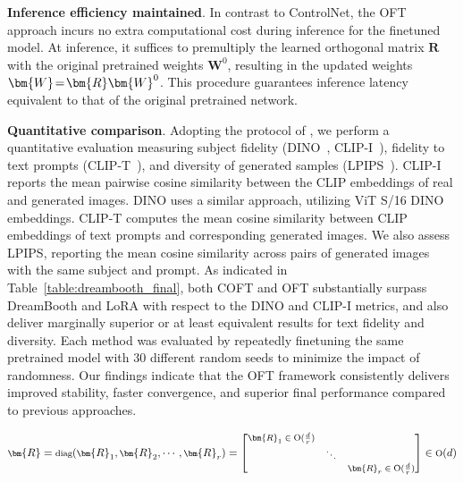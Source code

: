 \textbf{Inference efficiency maintained}. In contrast to ControlNet, the OFT approach incurs no extra computational cost during inference for the finetuned model. At inference, it suffices to premultiply the learned orthogonal matrix $\bm{R}$ with the original pretrained weights $\bm{W}^0$, resulting in the updated weights $\thickmuskip=2mu \medmuskip=2mu \bm{W}=\bm{R}\bm{W}^0$. This procedure guarantees inference latency equivalent to that of the original pretrained network.

\textbf{Quantitative comparison}. Adopting the protocol of \cite{ruiz2023dreambooth}, we perform a quantitative evaluation measuring subject fidelity (DINO~\cite{caron2021emerging}, CLIP-I~\cite{radford2021learning}), fidelity to text prompts (CLIP-T~\cite{radford2021learning}), and diversity of generated samples (LPIPS~\cite{zhang2018unreasonable}). CLIP-I reports the mean pairwise cosine similarity between the CLIP embeddings of real and generated images. DINO uses a similar approach, utilizing ViT S/16 DINO embeddings. CLIP-T computes the mean cosine similarity between CLIP embeddings of text prompts and corresponding generated images. We also assess LPIPS, reporting the mean cosine similarity across pairs of generated images with the same subject and prompt. As indicated in Table~\ref{table:dreambooth_final}, both COFT and OFT substantially surpass DreamBooth and LoRA with respect to the DINO and CLIP-I metrics, and also deliver marginally superior or at least equivalent results for text fidelity and diversity. Each method was evaluated by repeatedly finetuning the same pretrained model with 30 different random seeds to minimize the impact of randomness. Our findings indicate that the OFT framework consistently delivers improved stability, faster convergence, and superior final performance compared to previous approaches.

\begin{equation}
    \footnotesize
    \bm{R}=\text{diag}(\bm{R}_1,\bm{R}_2,\cdots,\bm{R}_r)=\begin{bmatrix}
    \bm{R}_1\in \text{O}(\frac{d}{r}) &  &\\
    &\ddots & \\
    & & \bm{R}_r\in \text{O}(\frac{d}{r})
    \end{bmatrix}\in \text{O}(d)
\end{equation}

